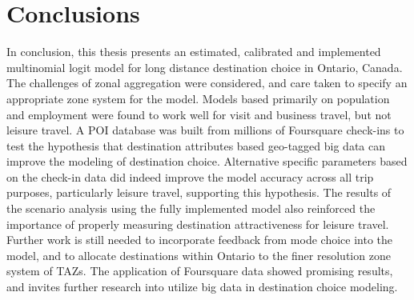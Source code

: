 \section{Conclusions}
In conclusion, this thesis presents an estimated, calibrated and implemented multinomial logit model for long distance destination choice in Ontario, Canada. The challenges of zonal aggregation were considered, and care taken to specify an appropriate zone system for the model. Models based primarily on population and employment were found to work well for visit and business travel, but not leisure travel. A POI database was built from millions of Foursquare check-ins to test the hypothesis that destination attributes based geo-tagged big data can improve the modeling of destination choice. Alternative specific parameters based on the check-in data did indeed improve the model accuracy across all trip purposes, particularly leisure travel, supporting this hypothesis. The results of the scenario analysis using the fully implemented model also reinforced the importance of properly measuring destination attractiveness for leisure travel. Further work is still needed to incorporate feedback from mode choice into the model, and to allocate destinations within Ontario to the finer resolution zone system of TAZs. The application of Foursquare data showed promising results, and invites further research into utilize big data in destination choice modeling.
